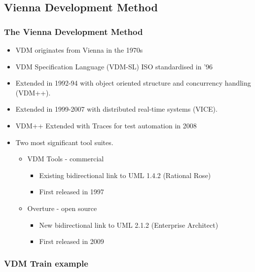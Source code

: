 \subsection{Vienna Development Method}
%
%
\frame
{
  \frametitle{The Vienna Development Method}


  \begin{itemize}
  		\item<1-> VDM originates from Vienna in the 1970s
  		\item<1-> VDM Specification Language (VDM-SL) ISO standardised in '96
  		\item<2-> Extended in 1992-94 with object oriented structure and concurrency handling (VDM++).
  		\item<3-> Extended in 1999-2007 with distributed real-time systems (VICE).
	  	\item<4-> VDM++ Extended with Traces for test automation in 2008
  		\item<5-> Two most significant tool suites.
  		\begin{itemize}
  			\item<6-> VDM Tools - commercial
			\begin{itemize}
				\item Existing bidirectional link to UML 1.4.2 (Rational Rose)
				\item First released in 1997
			\end{itemize}
  			\item<7-> Overture - open source
			\begin{itemize}
				\item New bidirectional link to UML 2.1.2 (Enterprise Architect)
				\item First released in 2009
			\end{itemize}
  		\end{itemize}

  \end{itemize}


}

%
%
\frame
{
  \frametitle{VDM Train example}

\begin{center}


\end{center}
}

